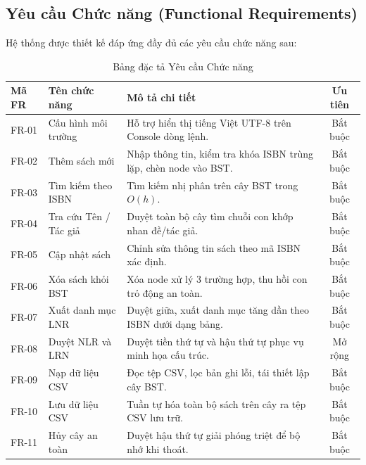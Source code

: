 \subsection{Yêu cầu Chức năng (Functional Requirements)}
Hệ thống được thiết kế đáp ứng đầy đủ các yêu cầu chức năng sau:
\begin{table}[htbp]
\centering
\caption{Bảng đặc tả Yêu cầu Chức năng}
\label{tab:functional_req}
\small
\begin{tabularx}{\textwidth}{l l X c}
\toprule
\textbf{Mã FR} & \textbf{Tên chức năng} & \textbf{Mô tả chi tiết} & \textbf{Ưu tiên} \\
\midrule
FR-01 & Cấu hình môi trường & Hỗ trợ hiển thị tiếng Việt UTF-8 trên Console dòng lệnh. & Bắt buộc \\
FR-02 & Thêm sách mới & Nhập thông tin, kiểm tra khóa ISBN trùng lặp, chèn node vào BST. & Bắt buộc \\
FR-03 & Tìm kiếm theo ISBN & Tìm kiếm nhị phân trên cây BST trong $O(h)$. & Bắt buộc \\
FR-04 & Tra cứu Tên / Tác giả & Duyệt toàn bộ cây tìm chuỗi con khớp nhan đề/tác giả. & Bắt buộc \\
FR-05 & Cập nhật sách & Chỉnh sửa thông tin sách theo mã ISBN xác định. & Bắt buộc \\
FR-06 & Xóa sách khỏi BST & Xóa node xử lý 3 trường hợp, thu hồi con trỏ động an toàn. & Bắt buộc \\
FR-07 & Xuất danh mục LNR & Duyệt giữa, xuất danh mục tăng dần theo ISBN dưới dạng bảng. & Bắt buộc \\
FR-08 & Duyệt NLR và LRN & Duyệt tiền thứ tự và hậu thứ tự phục vụ minh họa cấu trúc. & Mở rộng \\
FR-09 & Nạp dữ liệu CSV & Đọc tệp CSV, lọc bản ghi lỗi, tái thiết lập cây BST. & Bắt buộc \\
FR-10 & Lưu dữ liệu CSV & Tuần tự hóa toàn bộ sách trên cây ra tệp CSV lưu trữ. & Bắt buộc \\
FR-11 & Hủy cây an toàn & Duyệt hậu thứ tự giải phóng triệt để bộ nhớ khi thoát. & Bắt buộc \\
\bottomrule
\end{tabularx}
\end{table}

